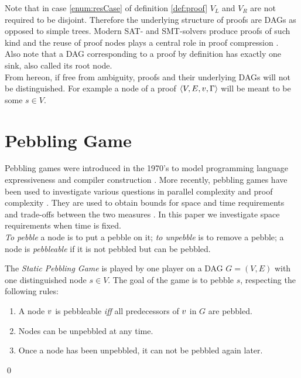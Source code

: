 \documentclass{llncs}
\begin{document}
\noindent
Note that in case \ref{enum:resCase} of definition \ref{def:proof} $V_L$ and $V_R$ are not required to be disjoint. Therefore the underlying structure of proofs are DAGs as opposed to simple trees. Modern SAT- and SMT-solvers produce proofs of such kind \cite{BoutonCaminha-B.-de-OliveiraDeharbeFontaine2009veriT:-an-open-trustable-and-efficient-SMT-Solver,marques2009conflict} and the reuse of proof nodes plays a central role in proof compression \cite{fontaine2011compression}.\\
Also note that a DAG corresponding to a proof by definition has exactly one sink, also called its root node.\\
From hereon, if free from ambiguity, proofs and their underlying DAGs will not be distinguished. For example a node of a proof $\langle V,E,v,\Gamma \rangle$ will be meant to be some $s \in V$.

\section{Pebbling Game}
\label{sec:pebbling-game}

Pebbling games were introduced in the 1970's to model programming language expressiveness \cite{paterson1970comparative,Walker1973404} and compiler construction \cite{sethi1975complete}. More recently, pebbling games have been used to investigate various questions in parallel complexity \cite{chan2013pebble} and proof complexity \cite{ben2008short,Esteban200184,nordstrom2009narrow}. They are used to obtain bounds for space and time requirements and trade-offs between the two measures \cite{van1979move,ben2009size}. In this paper we investigate space requirements when time is fixed.\\
\textit{To pebble} a node is to put a pebble on it; \textit{to unpebble} is to remove a pebble; a node is \textit{pebbleable} if it is not pebbled but can be pebbled.

\begin{definition}
\label{def:pebbling-game}
The \emph{Static Pebbling Game} is played by one player on a DAG $G = (V,E)$ with one distinguished node $s \in V$.
The goal of the game is to pebble $s$, respecting the following rules:
\begin{enumerate}
	\item \label{rule:premises} A node $v$ is pebbleable \emph{iff} all predecessors of $v$ in $G$ are pebbled.
	\item \label{rule:unpebbling} Nodes can be unpebbled at any time.
	\item \label{rule:onlyonce} Once a node has been unpebbled, it can not be pebbled again later.
\end{enumerate}
\qed
\end{definition}
\end{document}

